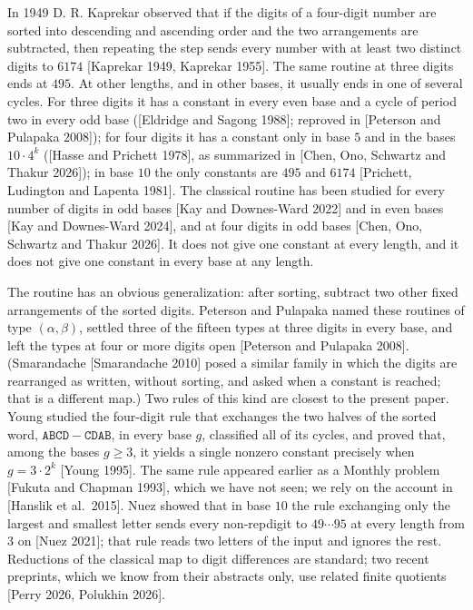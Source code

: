 \documentclass[11pt,letterpaper]{article}
\theoremstyle{paperstyle}
\theoremstyle{paperstyledef}
\theoremstyle{paperstylerem}
\begin{document}
In 1949 D. R. Kaprekar observed that if the digits of a four-digit number are sorted into descending and ascending order and the two arrangements are subtracted, then repeating the step sends every number with at least two distinct digits to \(6174\) {[}Kaprekar 1949, Kaprekar 1955{]}. The same routine at three digits ends at \(495\). At other lengths, and in other bases, it usually ends in one of several cycles. For three digits it has a constant in every even base and a cycle of period two in every odd base ({[}Eldridge and Sagong 1988{]}; reproved in {[}Peterson and Pulapaka 2008{]}); for four digits it has a constant only in base \(5\) and in the bases \(10 \cdot 4^k\) ({[}Hasse and Prichett 1978{]}, as summarized in {[}Chen, Ono, Schwartz and Thakur 2026{]}); in base \(10\) the only constants are \(495\) and \(6174\) {[}Prichett, Ludington and Lapenta 1981{]}. The classical routine has been studied for every number of digits in odd bases {[}Kay and Downes-Ward 2022{]} and in even bases {[}Kay and Downes-Ward 2024{]}, and at four digits in odd bases {[}Chen, Ono, Schwartz and Thakur 2026{]}. It does not give one constant at every length, and it does not give one constant in every base at any length.

The routine has an obvious generalization: after sorting, subtract two other fixed arrangements of the sorted digits. Peterson and Pulapaka named these routines of type \((\alpha, \beta)\), settled three of the fifteen types at three digits in every base, and left the types at four or more digits open {[}Peterson and Pulapaka 2008{]}. (Smarandache {[}Smarandache 2010{]} posed a similar family in which the digits are rearranged as written, without sorting, and asked when a constant is reached; that is a different map.) Two rules of this kind are closest to the present paper. Young studied the four-digit rule that exchanges the two halves of the sorted word, \(\mathtt{ABCD} - \mathtt{CDAB}\), in every base \(g\), classified all of its cycles, and proved that, among the bases \(g \geq 3\), it yields a single nonzero constant precisely when \(g = 3 \cdot 2^k\) {[}Young 1995{]}. The same rule appeared earlier as a Monthly problem {[}Fukuta and Chapman 1993{]}, which we have not seen; we rely on the account in {[}Hanslik et al.~2015{]}. Nuez showed that in base \(10\) the rule exchanging only the largest and smallest letter sends every non-repdigit to \(49\cdots95\) at every length from \(3\) on {[}Nuez 2021{]}; that rule reads two letters of the input and ignores the rest. Reductions of the classical map to digit differences are standard; two recent preprints, which we know from their abstracts only, use related finite quotients {[}Perry 2026, Polukhin 2026{]}.
\end{document}
